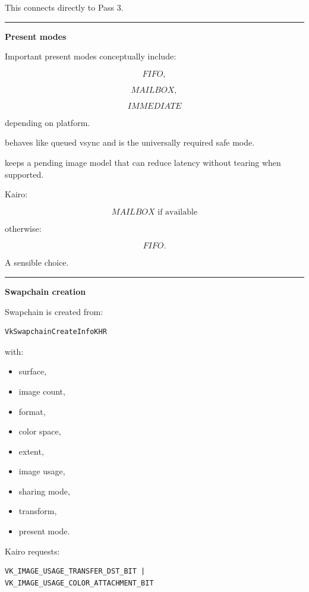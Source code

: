 This connects directly to Pass 3.

\begin{center}\rule{0.5\linewidth}{0.5pt}\end{center}

\textbf{Present modes}

Important present modes conceptually include:

\[
FIFO,
\]

\[
MAILBOX,
\]

\[
IMMEDIATE
\]

depending on platform.

 behaves like queued vsync and is the universally required safe mode.

 keeps a pending image model that can reduce latency without tearing when supported.

Kairo:

\[
\boxed{
MAILBOX\text{ if available}
}
\]

otherwise:

\[
\boxed{
FIFO.
}
\]

A sensible choice.

\begin{center}\rule{0.5\linewidth}{0.5pt}\end{center}

\textbf{Swapchain creation}

Swapchain is created from:

\begin{verbatim}
VkSwapchainCreateInfoKHR
\end{verbatim}

with:

\begin{itemize}
\tightlist
\item
  surface,
\item
  image count,
\item
  format,
\item
  color space,
\item
  extent,
\item
  image usage,
\item
  sharing mode,
\item
  transform,
\item
  present mode.
\end{itemize}

Kairo requests:

\begin{verbatim}
VK_IMAGE_USAGE_TRANSFER_DST_BIT |
VK_IMAGE_USAGE_COLOR_ATTACHMENT_BIT
\end{verbatim}

